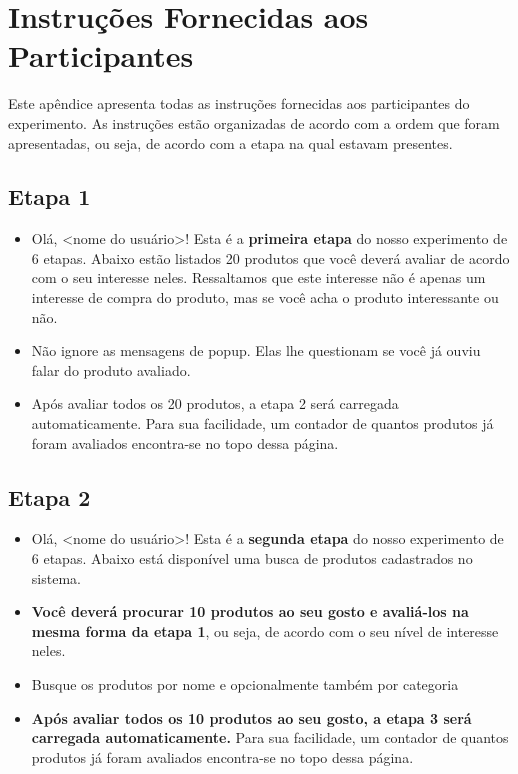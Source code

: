 \chapter{Instruções Fornecidas aos Participantes} %
\label{cha:instrucoes_fornecidas_aos_participantes}

Este apêndice apresenta todas as instruções fornecidas aos participantes do experimento. As instruções estão organizadas de acordo com a ordem que foram apresentadas, ou seja, de acordo com a etapa na qual estavam presentes.

\section*{Etapa 1} %
\label{sec:c_etapa_1}
\begin{itemize}
  \item Olá, <nome do usuário>! Esta é a \textbf{primeira etapa} do nosso experimento de 6 etapas. Abaixo estão listados 20 produtos que você deverá avaliar de acordo com o seu interesse neles. Ressaltamos que este interesse não é apenas um interesse de compra do produto, mas se você acha o produto interessante ou não.
  \item Não ignore as mensagens de popup. Elas lhe questionam se você já ouviu falar do produto avaliado.
  \item Após avaliar todos os 20 produtos, a etapa 2 será carregada automaticamente. Para sua facilidade, um contador de quantos produtos já foram avaliados encontra-se no topo dessa página.
\end{itemize}


\section*{Etapa 2} %
\label{sec:c_etapa_2}
\begin{itemize}
    \item Olá, <nome do usuário>! Esta é a \textbf{segunda etapa} do nosso experimento de 6 etapas. Abaixo está disponível uma busca de produtos cadastrados no sistema.
    \item \textbf{Você deverá procurar 10 produtos ao seu gosto e avaliá-los na mesma forma da etapa 1}, ou seja, de acordo com o seu nível de interesse neles.
    \item Busque os produtos por nome e opcionalmente também por categoria
    \item \textbf{Após avaliar todos os 10 produtos ao seu gosto, a etapa 3 será carregada automaticamente.} Para sua facilidade, um contador de quantos produtos já foram avaliados encontra-se no topo dessa página.
\end{itemize}

